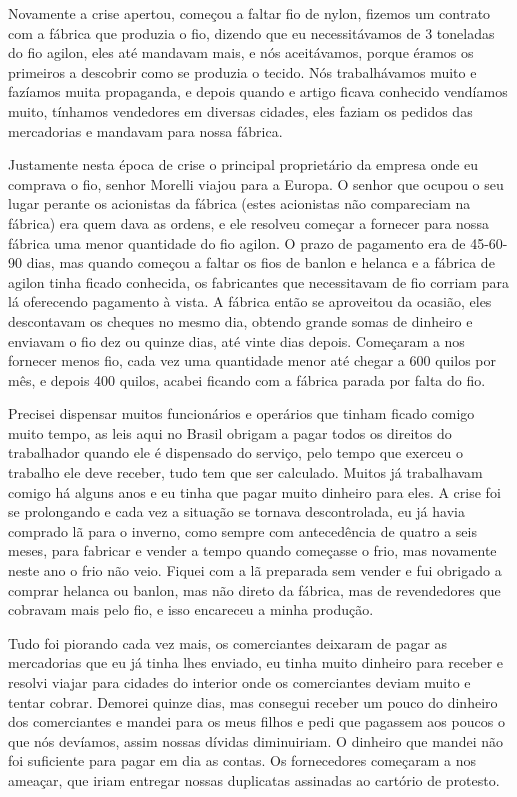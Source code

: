 Novamente a crise apertou, começou a faltar fio de nylon, fizemos um
contrato com a fábrica que produzia o fio, dizendo que eu necessitávamos
de 3 toneladas do fio agilon, eles até mandavam mais, e nós aceitávamos,
porque éramos os primeiros a descobrir como se produzia o tecido. Nós
trabalhávamos muito e fazíamos muita propaganda, e depois quando e
artigo ficava conhecido vendíamos muito, tínhamos vendedores em diversas
cidades, eles faziam os pedidos das mercadorias e mandavam para nossa
fábrica.

Justamente nesta época de crise o principal proprietário da empresa onde
eu comprava o fio, senhor Morelli viajou para a Europa. O senhor que
ocupou o seu lugar perante os acionistas da fábrica (estes acionistas
não compareciam na fábrica) era quem dava as ordens, e ele resolveu
começar a fornecer para nossa fábrica uma menor quantidade do fio
agilon. O prazo de pagamento era de 45-60-90 dias, mas quando começou a
faltar os fios de banlon e helanca e a fábrica de agilon tinha ficado
conhecida, os fabricantes que necessitavam de fio corriam para lá
oferecendo pagamento à vista. A fábrica então se aproveitou da ocasião,
eles descontavam os cheques no mesmo dia, obtendo grande somas de
dinheiro e enviavam o fio dez ou quinze dias, até vinte dias depois.
Começaram a nos fornecer menos fio, cada vez uma quantidade menor até
chegar a 600 quilos por mês, e depois 400 quilos, acabei ficando com a
fábrica parada por falta do fio.

Precisei dispensar muitos funcionários e operários que tinham ficado
comigo muito tempo, as leis aqui no Brasil obrigam a pagar todos os
direitos do trabalhador quando ele é dispensado do serviço, pelo tempo
que exerceu o trabalho ele deve receber, tudo tem que ser calculado.
Muitos já trabalhavam comigo há alguns anos e eu tinha que pagar muito
dinheiro para eles. A crise foi se prolongando e cada vez a situação se
tornava descontrolada, eu já havia comprado lã para o inverno, como
sempre com antecedência de quatro a seis meses, para fabricar e vender a
tempo quando começasse o frio, mas novamente neste ano o frio não veio.
Fiquei com a lã preparada sem vender e fui obrigado a comprar helanca ou
banlon, mas não direto da fábrica, mas de revendedores que cobravam mais
pelo fio, e isso encareceu a minha produção.

Tudo foi piorando cada vez mais, os comerciantes deixaram de pagar as
mercadorias que eu já tinha lhes enviado, eu tinha muito dinheiro para
receber e resolvi viajar para cidades do interior onde os comerciantes
deviam muito e tentar cobrar. Demorei quinze dias, mas consegui receber
um pouco do dinheiro dos comerciantes e mandei para os meus filhos e
pedi que pagassem aos poucos o que nós devíamos, assim nossas dívidas
diminuiriam. O dinheiro que mandei não foi suficiente para pagar em dia
as contas. Os fornecedores começaram a nos ameaçar, que iriam entregar
nossas duplicatas assinadas ao cartório de protesto.

